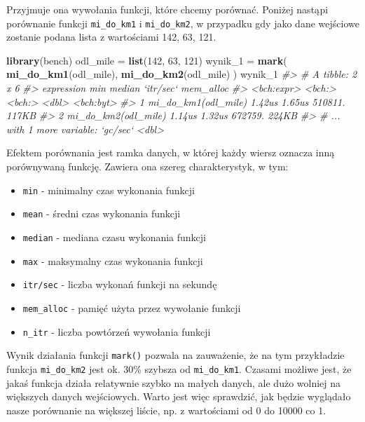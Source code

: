 \documentclass[paper=6in:9in,pagesize=pdftex,headinclude=on,footinclude=on,10pt]{scrbook}
\newenvironment{Shaded}{\begin{snugshade}}{\end{snugshade}}
\newcommand{\CommentTok}[1]{\textcolor[rgb]{0.56,0.35,0.01}{\textit{#1}}}
\newcommand{\DecValTok}[1]{\textcolor[rgb]{0.00,0.00,0.81}{#1}}
\newcommand{\KeywordTok}[1]{\textcolor[rgb]{0.13,0.29,0.53}{\textbf{#1}}}
\newcommand{\NormalTok}[1]{#1}
\newcommand{\StringTok}[1]{\textcolor[rgb]{0.31,0.60,0.02}{#1}}
\providecommand{\tightlist}{%
  \setlength{\itemsep}{0pt}\setlength{\parskip}{0pt}}
\begin{document}
Przyjmuje ona wywołania funkcji, które chcemy porównać.
Poniżej nastąpi porównanie funkcji \texttt{mi\_do\_km1} i \texttt{mi\_do\_km2}, w przypadku gdy jako dane wejściowe zostanie podana lista z wartościami 142, 63, 121.

\begin{Shaded}
\begin{Highlighting}[]
\KeywordTok{library}\NormalTok{(bench)}
\NormalTok{odl_mile =}\StringTok{ }\KeywordTok{list}\NormalTok{(}\DecValTok{142}\NormalTok{, }\DecValTok{63}\NormalTok{, }\DecValTok{121}\NormalTok{)}
\NormalTok{wynik_}\DecValTok{1}\NormalTok{ =}\StringTok{ }\KeywordTok{mark}\NormalTok{(}
  \KeywordTok{mi_do_km1}\NormalTok{(odl_mile),}
  \KeywordTok{mi_do_km2}\NormalTok{(odl_mile)}
\NormalTok{)}
\NormalTok{wynik_}\DecValTok{1}
\CommentTok{#> # A tibble: 2 x 6}
\CommentTok{#>   expression             min median `itr/sec` mem_alloc}
\CommentTok{#>   <bch:expr>          <bch:> <bch:>     <dbl> <bch:byt>}
\CommentTok{#> 1 mi_do_km1(odl_mile) 1.42us 1.65us   510811.     117KB}
\CommentTok{#> 2 mi_do_km2(odl_mile) 1.14us 1.32us   672759.     224KB}
\CommentTok{#> # ... with 1 more variable: `gc/sec` <dbl>}
\end{Highlighting}
\end{Shaded}

Efektem porównania jest ramka danych, w której każdy wiersz oznacza inną porównywaną funkcję.
Zawiera ona szereg charakterystyk, w tym:

\begin{itemize}
\tightlist
\item
  \texttt{min} - minimalny czas wykonania funkcji
\item
  \texttt{mean} - średni czas wykonania funkcji
\item
  \texttt{median} - mediana czasu wykonania funkcji
\item
  \texttt{max} - maksymalny czas wykonania funkcji
\item
  \texttt{itr/sec} - liczba wykonań funkcji na sekundę
\item
  \texttt{mem\_alloc} - pamięć użyta przez wywołanie funkcji
\item
  \texttt{n\_itr} - liczba powtórzeń wywołania funkcji
\end{itemize}

Wynik działania funkcji \texttt{mark()} pozwala na zauważenie, że na tym przykładzie funkcja \texttt{mi\_do\_km2} jest ok. 30\% szybsza od \texttt{mi\_do\_km1}.
Czasami możliwe jest, że jakaś funkcja działa relatywnie szybko na małych danych, ale dużo wolniej na większych danych wejściowych.
Warto jest więc sprawdzić, jak będzie wyglądało nasze porównanie na większej liście, np. z wartościami od 0 do 10000 co 1.
\end{document}
